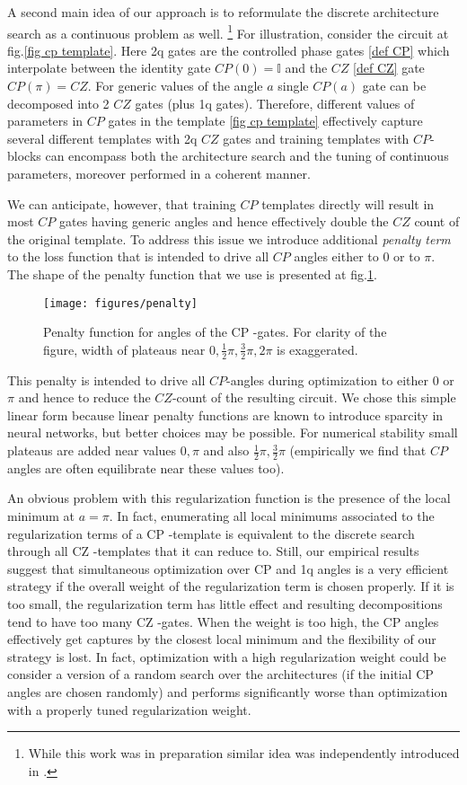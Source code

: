 \documentclass[draft, amsfonts, amssymb, aps, nofootinbib, twocolumn]{revtex4-2}
\newcommand{\CZ}{CZ }
\newcommand{\CP}{CP }
\begin{document}
A second main idea of our approach is to reformulate the discrete architecture search as a continuous problem as well. \footnote{While this work was in preparation similar idea was independently introduced in \cite{Rakyta2022}.} For illustration, consider the circuit at fig.\ref{fig cp template}. Here 2q gates are the controlled phase gates \eqref{def CP} which interpolate between the identity gate $CP(0)=\mathbb{I}$ and the $CZ$ \eqref{def CZ} gate $CP(\pi)=CZ$. For generic values of the angle $a$ single $CP(a)$ gate can be decomposed into 2 $CZ$ gates (plus 1q gates). Therefore, different values of parameters in $CP$ gates in the template \eqref{fig cp template} effectively capture several different templates with 2q $CZ$ gates and training templates with $CP$-blocks can encompass both the architecture search and the tuning of continuous parameters, moreover performed in a coherent manner.

We can anticipate, however, that training $CP$ templates directly will result in most $CP$ gates having generic angles and hence effectively double the $CZ$ count of the original template. To address this issue we introduce additional \textit{penalty term} to the loss function that is intended to drive all $CP$ angles either to $0$ or to $\pi$. The shape of the penalty function that we use is presented at fig.\ref{fig penalty}.
\begin{figure}
\texttt{[image: figures/penalty]}
\caption{Penalty function for angles of the \CP-gates. For clarity of the figure, width of plateaus near $0,\frac12\pi, \frac32\pi, 2\pi$ is exaggerated.}
\label{fig penalty}
\end{figure}

This penalty is intended to drive all $CP$-angles during optimization to either $0$ or $\pi$ and hence to reduce the $CZ$-count of the resulting circuit. We chose this simple linear form because linear penalty functions are known to introduce sparcity \cite{} in neural networks, but better choices may be possible. For numerical stability small plateaus are added near values $0,\pi$ and also $\frac12\pi, \frac32\pi$  (empirically we find that $CP$ angles are often equilibrate near these values too).

An obvious problem with this regularization function is the presence of the local minimum at $a=\pi$. In fact, enumerating all local minimums associated to the regularization terms of a \CP-template is equivalent to the discrete search through all \CZ-templates that it can reduce to. Still, our empirical results suggest that simultaneous optimization over \CP and 1q angles is a very efficient strategy if the overall weight of the regularization term is chosen properly. If it is too small, the regularization term has little effect and resulting decompositions tend to have too many \CZ-gates. When the weight is too high, the \CP angles effectively get captures by the closest local minimum and the flexibility of our strategy is lost. In fact, optimization with a high regularization weight could be consider a version of a random search over the architectures (if the initial \CP angles are chosen randomly) and performs significantly worse than optimization with a properly tuned regularization weight.
\end{document}

